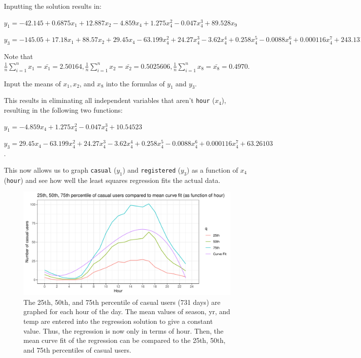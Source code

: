 \documentclass[
]{article}
\begin{document}
Inputting the solution results in:

\(y_{1} = -42.145 + 0.6875x_{1} + 12.887x_{2} - 4.859x_{4} + 1.275x_{4}^{2} - 0.047x_{4}^{3} + 89.528x_{9}\)

\(y_{3} = -145.05 + 17.18x_{1} + 88.57x_{2} + 29.45x_{4} - 63.199x_{4}^{2} + 24.27x_{4}^{3} - 3.62x_{4}^{4} + 0.258x_{4}^{5} - 0.0088x_{4}^{6} + 0.000116x_{4}^{7} + 243.131x_{9}\)

Note that
\(\frac{1}{n}\sum_{i=1}^{n} x_{1} = \bar{x_{1}} = 2.50164, \frac{1}{n}\sum_{i=1}^{n} x_{2} = \bar{x_{2}} = 0.5025606, \frac{1}{n}\sum_{i=1}^{n} x_{8} = \bar{x_{8}} = 0.4970\).

Input the means of \(x_{1}, x_{2}\), and \(x_{8}\) into the formulas of
\(y_{1}\) and \(y_{3}\).

This results in eliminating all independent variables that aren't
\texttt{hour} (\(x_{4}\)), resulting in the following two functions:

\(y_{1} = -4.859x_{4} + 1.275x_{4}^{2} -0.047x_{4}^{3} + 10.54523\)

\(y_{3} = 29.45x_{4} - 63.199x_{4}^{2} + 24.27x_{4}^{3} - 3.62x_{4}^{4} + 0.258x_{4}^{5} - 0.0088x_{4}^{6} + 0.000116x_{4}^{7} + 63.26103\).

This now allows us to graph \texttt{casual} (\(y_{1}\)) and
\texttt{registered} (\(y_{3}\)) as a function of \(x_{4}\)
(\texttt{hour}) and see how well the least squares regression fits the
actual data.

\newpage

\begin{figure}
\centering
\includegraphics{LeastSquares_files/figure-latex/unnamed-chunk-12-1.pdf}
\caption{The 25th, 50th, and 75th percentile of casual users (731 days)
are graphed for each hour of the day. The mean values of season, yr, and
temp are entered into the regression solution to give a constant value.
Thus, the regression is now only in terms of hour. Then, the mean curve
fit of the regression can be compared to the 25th, 50th, and 75th
percentiles of casual users.}
\end{figure}
\end{document}
